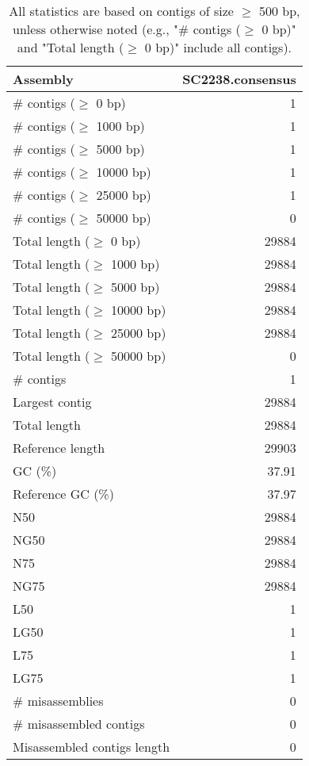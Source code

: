 \documentclass[12pt,a4paper]{article}
\begin{document}
\begin{table}[ht]
\begin{center}
\caption{All statistics are based on contigs of size $\geq$ 500 bp, unless otherwise noted (e.g., "\# contigs ($\geq$ 0 bp)" and "Total length ($\geq$ 0 bp)" include all contigs).}
\begin{tabular}{|l*{1}{|r}|}
\hline
Assembly & SC2238.consensus \\ \hline
\# contigs ($\geq$ 0 bp) & 1 \\ \hline
\# contigs ($\geq$ 1000 bp) & 1 \\ \hline
\# contigs ($\geq$ 5000 bp) & 1 \\ \hline
\# contigs ($\geq$ 10000 bp) & 1 \\ \hline
\# contigs ($\geq$ 25000 bp) & 1 \\ \hline
\# contigs ($\geq$ 50000 bp) & 0 \\ \hline
Total length ($\geq$ 0 bp) & 29884 \\ \hline
Total length ($\geq$ 1000 bp) & 29884 \\ \hline
Total length ($\geq$ 5000 bp) & 29884 \\ \hline
Total length ($\geq$ 10000 bp) & 29884 \\ \hline
Total length ($\geq$ 25000 bp) & 29884 \\ \hline
Total length ($\geq$ 50000 bp) & 0 \\ \hline
\# contigs & 1 \\ \hline
Largest contig & 29884 \\ \hline
Total length & 29884 \\ \hline
Reference length & 29903 \\ \hline
GC (\%) & 37.91 \\ \hline
Reference GC (\%) & 37.97 \\ \hline
N50 & 29884 \\ \hline
NG50 & 29884 \\ \hline
N75 & 29884 \\ \hline
NG75 & 29884 \\ \hline
L50 & 1 \\ \hline
LG50 & 1 \\ \hline
L75 & 1 \\ \hline
LG75 & 1 \\ \hline
\# misassemblies & 0 \\ \hline
\# misassembled contigs & 0 \\ \hline
Misassembled contigs length & 0 \\ \hline

\end{tabular}
\end{center}
\end{table}
\end{document}
